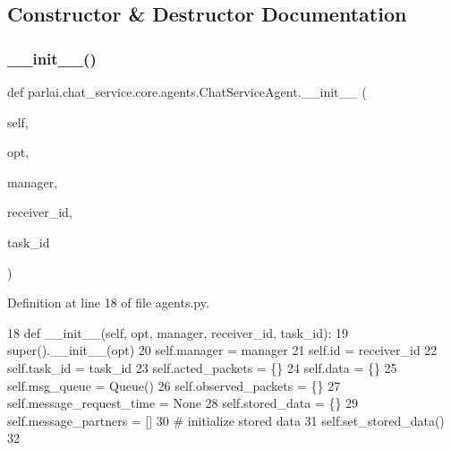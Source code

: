 \subsection{Constructor \& Destructor Documentation}
\mbox{\label{classparlai_1_1chat__service_1_1core_1_1agents_1_1ChatServiceAgent_a75af2a1c4766564b0143595ed8a5e3c9}} 
\subsubsection{\texorpdfstring{\+\_\+\+\_\+init\+\_\+\+\_\+()}{\_\_init\_\_()}}
{\footnotesize\ttfamily def parlai.\+chat\+\_\+service.\+core.\+agents.\+Chat\+Service\+Agent.\+\_\+\+\_\+init\+\_\+\+\_\+ (\begin{DoxyParamCaption}\item[{}]{self,  }\item[{}]{opt,  }\item[{}]{manager,  }\item[{}]{receiver\+\_\+id,  }\item[{}]{task\+\_\+id }\end{DoxyParamCaption})}



Definition at line 18 of file agents.\+py.


\begin{DoxyCode}
18     \textcolor{keyword}{def }\_\_init\_\_(self, opt, manager, receiver\_id, task\_id):
19         super().\_\_init\_\_(opt)
20         self.manager = manager
21         self.id = receiver\_id
22         self.task\_id = task\_id
23         self.acted\_packets = \{\}
24         self.data = \{\}
25         self.msg\_queue = Queue()
26         self.observed\_packets = \{\}
27         self.message\_request\_time = \textcolor{keywordtype}{None}
28         self.stored\_data = \{\}
29         self.message\_partners = []
30         \textcolor{comment}{# initialize stored data}
31         self.set\_stored\_data()
32 
\end{DoxyCode}



